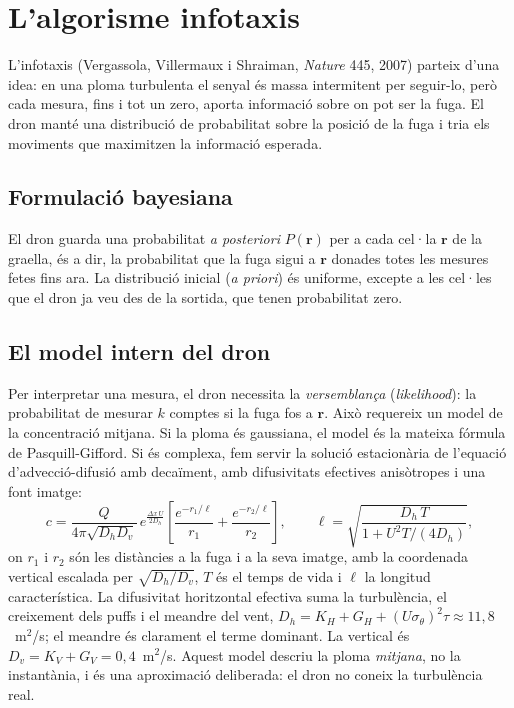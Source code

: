 \documentclass[11pt,a4paper]{article}
\begin{document}
\section{L'algorisme infotaxis}

L'infotaxis (Vergassola, Villermaux i Shraiman, \emph{Nature} 445, 2007) parteix d'una idea: en una ploma turbulenta el senyal és massa intermitent per seguir-lo, però cada mesura, fins i tot un zero, aporta informació sobre on pot ser la fuga. El dron manté una distribució de probabilitat sobre la posició de la fuga i tria els moviments que maximitzen la informació esperada.

\subsection{Formulació bayesiana}

El dron guarda una probabilitat \emph{a posteriori} $P(\mathbf{r})$ per a cada cel·la $\mathbf{r}$ de la graella, és a dir, la probabilitat que la fuga sigui a $\mathbf{r}$ donades totes les mesures fetes fins ara. La distribució inicial (\emph{a priori}) és uniforme, excepte a les cel·les que el dron ja veu des de la sortida, que tenen probabilitat zero.

\subsection{El model intern del dron}
\label{sec:model}

Per interpretar una mesura, el dron necessita la \emph{versemblança} (\emph{likelihood}): la probabilitat de mesurar $k$ comptes si la fuga fos a $\mathbf{r}$. Això requereix un model de la concentració mitjana. Si la ploma és gaussiana, el model és la mateixa fórmula de Pasquill-Gifford. Si és complexa, fem servir la solució estacionària de l'equació d'advecció-difusió amb decaïment, amb difusivitats efectives anisòtropes i una font imatge:
\begin{equation}
c = \frac{Q}{4\pi\sqrt{D_h D_v}}\, e^{\frac{\Delta x\, U}{2D_h}} \left[\frac{e^{-r_1/\ell}}{r_1} + \frac{e^{-r_2/\ell}}{r_2}\right], \qquad \ell = \sqrt{\frac{D_h\, T}{1 + U^2 T/(4 D_h)}},
\end{equation}
on $r_1$ i $r_2$ són les distàncies a la fuga i a la seva imatge, amb la coordenada vertical escalada per $\sqrt{D_h/D_v}$, $T$ és el temps de vida i $\ell$ la longitud característica. La difusivitat horitzontal efectiva suma la turbulència, el creixement dels puffs i el meandre del vent, $D_h = K_H + G_H + (U\sigma_\theta)^2\tau \approx 11{,}8$~m$^2$/s; el meandre és clarament el terme dominant. La vertical és $D_v = K_V + G_V = 0{,}4$~m$^2$/s. Aquest model descriu la ploma \emph{mitjana}, no la instantània, i és una aproximació deliberada: el dron no coneix la turbulència real.
\end{document}
